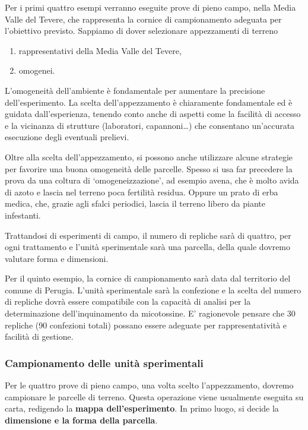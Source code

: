 \documentclass[a4paper,12pt,oneside]{book}
\providecommand{\tightlist}{%
  \setlength{\itemsep}{0pt}\setlength{\parskip}{0pt}}
\begin{document}
Per i primi quattro esempi verranno eseguite prove di pieno campo, nella
Media Valle del Tevere, che rappresenta la cornice di campionamento
adeguata per l'obiettivo previsto. Sappiamo di dover selezionare
appezzamenti di terreno

\begin{enumerate}
\def\labelenumi{\arabic{enumi}.}
\tightlist
\item
  rappresentativi della Media Valle del Tevere,
\item
  omogenei.
\end{enumerate}

L'omogeneità dell'ambiente è fondamentale per aumentare la precisione
dell'esperimento. La scelta dell'appezzamento è chiaramente fondamentale
ed è guidata dall'esperienza, tenendo conto anche di aspetti come la
facilità di accesso e la vicinanza di strutture (laboratori,
capannoni\ldots{}) che consentano un'accurata esecuzione degli eventuali
prelievi.

Oltre alla scelta dell'appezzamento, si possono anche utilizzare alcune
strategie per favorire una buona omogeneità delle parcelle. Spesso si
usa far precedere la prova da una coltura di `omogeneizzazione', ad
esempio avena, che è molto avida di azoto e lascia nel terreno poca
fertilità residua. Oppure un prato di erba medica, che, grazie agli
sfalci periodici, lascia il terreno libero da piante infestanti.

Trattandosi di esperimenti di campo, il numero di repliche sarà di
quattro, per ogni trattamento e l'unità sperimentale sarà una parcella,
della quale dovremo valutare forma e dimensioni.

Per il quinto esempio, la cornice di campionamento sarà data dal
territorio del comune di Perugia. L'unità sperimentale sarà la
confezione e la scelta del numero di repliche dovrà essere compatibile
con la capacità di analisi per la determinazione dell'inquinamento da
micotossine. E' ragionevole pensare che 30 repliche (90 confezioni
totali) possano essere adeguate per rappresentatività e facilità di
gestione.

\subsubsection{Campionamento delle unità
sperimentali}\label{campionamento-delle-unita-sperimentali}

Per le quattro prove di pieno campo, una volta scelto l'appezzamento,
dovremo campionare le parcelle di terreno. Questa operazione viene
usualmente eseguita su carta, redigendo la \textbf{mappa
dell'esperimento}. In primo luogo, si decide la \textbf{dimensione e la
forma della parcella}.
\end{document}
